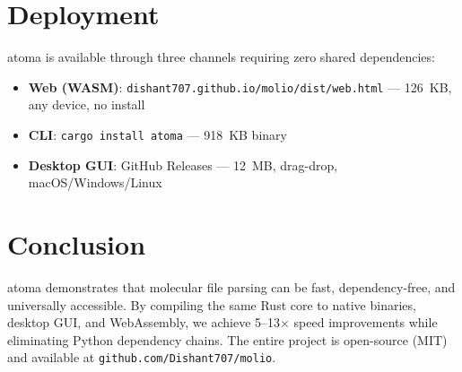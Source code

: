 \documentclass[10pt,conference]{IEEEtran}
\begin{document}
\section{Deployment}
atoma is available through three channels requiring zero shared dependencies:

\begin{itemize}
  \item \textbf{Web (WASM)}: \texttt{dishant707.github.io/molio/dist/web.html} --- 126~KB, any device, no install
  \item \textbf{CLI}: \texttt{cargo install atoma} --- 918~KB binary
  \item \textbf{Desktop GUI}: GitHub Releases --- 12~MB, drag-drop, macOS/Windows/Linux
\end{itemize}

\section{Conclusion}
atoma demonstrates that molecular file parsing can be fast, dependency-free, and universally accessible. By compiling the same Rust core to native binaries, desktop GUI, and WebAssembly, we achieve 5--13$\times$ speed improvements while eliminating Python dependency chains. The entire project is open-source (MIT) and available at \texttt{github.com/Dishant707/molio}.
\end{document}
